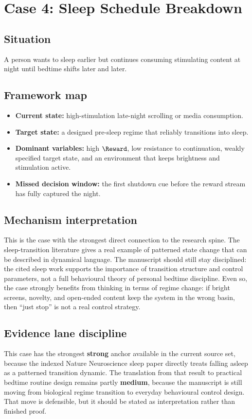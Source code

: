 \section{Case 4: Sleep Schedule Breakdown}

\subsection*{Situation}
A person wants to sleep earlier but continues consuming stimulating content at
night until bedtime shifts later and later.

\subsection*{Framework map}
\begin{itemize}[nosep]
  \item \textbf{Current state:} high-stimulation late-night scrolling or media
        consumption.
  \item \textbf{Target state:} a designed pre-sleep regime that reliably
        transitions into sleep.
  \item \textbf{Dominant variables:} high $\Reward$, low resistance to
        continuation, weakly specified target state, and an environment that
        keeps brightness and stimulation active.
  \item \textbf{Missed decision window:} the first shutdown cue before the
        reward stream has fully captured the night.
\end{itemize}

\subsection*{Mechanism interpretation}
This is the case with the strongest direct connection to the research spine.
The sleep-transition literature gives a real example of patterned state change
that can be described in dynamical language. The manuscript should still stay
disciplined: the cited sleep work supports the importance of transition
structure and control parameters, not a full behavioural theory of personal
bedtime discipline. Even so, the case strongly benefits from thinking in terms
of regime change: if bright screens, novelty, and open-ended content keep the
system in the wrong basin, then ``just stop'' is not a real control strategy.

\subsection*{Evidence lane discipline}
This case has the strongest \textbf{strong} anchor available in the current
source set, because the indexed Nature Neuroscience sleep paper directly treats
falling asleep as a patterned transition dynamic. The translation from that
result to practical bedtime routine design remains partly \textbf{medium},
because the manuscript is still moving from biological regime transition to
everyday behavioural control design. That move is defensible, but it should be
stated as interpretation rather than finished proof.

